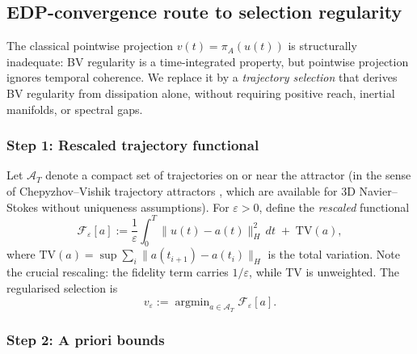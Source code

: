 \documentclass[12pt,a4paper]{article}
\theoremstyle{definition}
\theoremstyle{plain}
\theoremstyle{remark}
\begin{document}
\subsection{EDP-convergence route to selection regularity}\label{sec:gamma-edp-selection}

The classical pointwise projection $v(t) = \pi_A(u(t))$ is structurally inadequate: BV regularity is a time-integrated property, but pointwise projection ignores temporal coherence. We replace it by a \emph{trajectory selection} that derives BV regularity from dissipation alone, without requiring positive reach, inertial manifolds, or spectral gaps.

\subsubsection*{Step 1: Rescaled trajectory functional}

Let $\mathcal{A}_T$ denote a compact set of trajectories on or near the attractor (in the sense of Chepyzhov--Vishik trajectory attractors \cite{ChepyzhovVishik2002}, which are available for 3D Navier--Stokes without uniqueness assumptions). For $\varepsilon > 0$, define the \emph{rescaled} functional
\begin{equation}\label{eq:trajectory-functional}
  \mathcal{F}_\varepsilon[a] := \frac{1}{\varepsilon}\int_0^T \|u(t) - a(t)\|_H^2 \, dt \;+\; \mathrm{TV}(a),
\end{equation}
where $\mathrm{TV}(a) = \sup \sum_{i} \|a(t_{i+1}) - a(t_i)\|_H$ is the total variation. Note the crucial rescaling: the fidelity term carries $1/\varepsilon$, while TV is unweighted. The regularised selection is
\begin{equation}\label{eq:reg-selection}
  v_\varepsilon := \operatorname{argmin}_{a \in \mathcal{A}_T} \mathcal{F}_\varepsilon[a].
\end{equation}

\subsubsection*{Step 2: A priori bounds}
\end{document}
